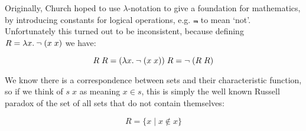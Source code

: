 \begin{slide*}

\vspace*{0.5cm}


Originally, Church hoped to use $\lambda$-notation to give a foundation for
mathematics, by introducing constants for logical operations, e.g. {\red
$\Not$} to mean `not'. Unfortunately this turned out to be inconsistent,
because defining {\red $R = \lambda x.\: \neg\; (x\; x)$} we have:

{\red $$ R\; R = (\lambda x.\: \neg\; (x\; x)) \; R = \neg\; (R\; R) $$}

We know there is a correspondence between sets and their characteristic
function, so if we think of {\red $s\;x$} as meaning {\red $x \in s$}, this is
simply the well known Russell paradox of the set of all sets that do not
contain themselves:

{\red $$ R = \{x \mid x \not\in x\} $$}

\end{slide*}





